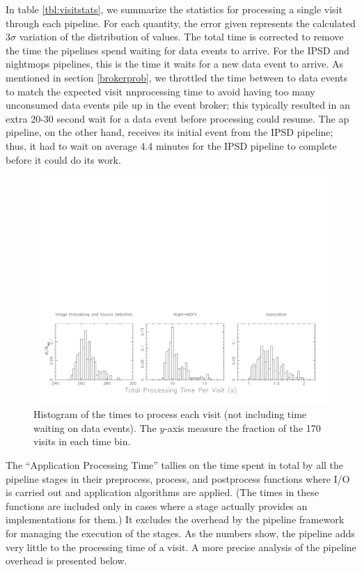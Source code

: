 In table \ref{tbl:visitstats}, we summarize the statistics for processing
a single visit through each pipeline.  For each quantity, the error
given represents the calculated $3\sigma$ variation of the
distribution of values.  The total time is corrected to remove the
time the pipelines spend waiting for data events to arrive.  For the
IPSD and nightmops pipelines, this is the time it waits for a new data
event to arrive.  As mentioned in section \ref{brokerprob}, we
throttled the time between to data events to match the expected visit
nnprocessing time to avoid having too many unconsumed data events pile
up in the event broker; this typically resulted in an extra 20-30
second wait for a data event before processing could resume.  The ap
pipeline, on the other hand, receives its initial event from the IPSD
pipeline; thus, it had to wait on average 4.4 minutes for the IPSD
pipeline to complete before it could do its work.

\begin{figure}[b]
\begin{center}
\includegraphics[width=\textwidth,viewport=25 25 775 250,clip]{images/visitdist.pdf}
\caption{Histogram of the times to process each visit (not including
  time waiting on data events).  The $y$-axis measure the fraction of
  the 170 visits in each time bin.  
\label{fig:visitdist}}
\end{center}
\end{figure}


The ``Application Processing Time'' tallies on the time spent in total
by all the pipeline stages in their preprocess, process, and
postprocess functions where I/O is carried out and application
algorithms are applied.  (The times in these functions are included
only in cases where a stage actually provides an implementations for
them.)  It excludes the overhead by the pipeline framework for
managing the execution of the stages.  As the numbers show, the
pipeline adds very little to the processing time of a visit.  A more
precise analysis of the pipeline overhead is presented below.  


